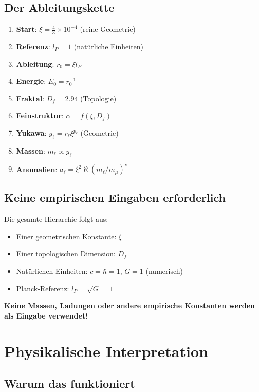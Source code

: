\documentclass[12pt,a4paper]{article}
\newcommand{\lP}{l_P}
\newcommand{\rzero}{r_0}
\newcommand{\Ezero}{E_0}
\newcommand{\xipar}{\xi}
\begin{document}
	\subsection{Der Ableitungskette}
	
	\begin{enumerate}
		\item \textbf{Start}: $\xipar = \frac{4}{3} \times 10^{-4}$ (reine Geometrie)
		\item \textbf{Referenz}: $\lP = 1$ (natürliche Einheiten)
		\item \textbf{Ableitung}: $\rzero = \xipar \lP$
		\item \textbf{Energie}: $\Ezero = \rzero^{-1}$
		\item \textbf{Fraktal}: $D_f = 2.94$ (Topologie)
		\item \textbf{Feinstruktur}: $\alpha = f(\xipar, D_f)$
		\item \textbf{Yukawa}: $y_\ell = r_\ell \xipar^{p_\ell}$ (Geometrie)
		\item \textbf{Massen}: $m_\ell \propto y_\ell$
		\item \textbf{Anomalien}: $a_\ell = \xipar^2 \aleph (m_\ell/m_\mu)^\nu$
	\end{enumerate}
	
	\subsection{Keine empirischen Eingaben erforderlich}
	
	Die gesamte Hierarchie folgt aus:
	\begin{itemize}
		\item Einer geometrischen Konstante: $\xipar$
		\item Einer topologischen Dimension: $D_f$
		\item Natürlichen Einheiten: $c = \hbar = 1$, $G = 1$ (numerisch)
		\item Planck-Referenz: $\lP = \sqrt{G} = 1$
	\end{itemize}
	
	\textbf{Keine Massen, Ladungen oder andere empirische Konstanten werden als Eingabe verwendet!}
	
	\section{Physikalische Interpretation}
	
	\subsection{Warum das funktioniert}
	
\end{document}
